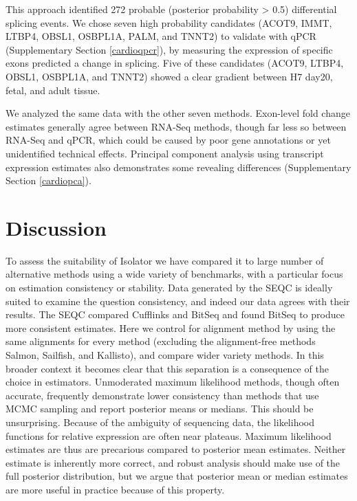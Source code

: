 \documentclass[twocolumn]{article}
\begin{document}
This approach identified 272 probable (posterior probability > 0.5) differential
splicing events. We chose seven high probability candidates (ACOT9, IMMT, LTBP4,
OBSL1, OSBPL1A, PALM, and TNNT2) to validate with qPCR (Supplementary Section
\ref{cardioqpcr}), by measuring the expression of specific exons predicted a
change in splicing. Five of these candidates (ACOT9, LTBP4, OBSL1, OSBPL1A, and
TNNT2) showed a clear gradient between H7 day20, fetal, and adult tissue.

We analyzed the same data with the other seven methods. Exon-level fold change
estimates generally agree between RNA-Seq methods, though far less so between
RNA-Seq and qPCR, which could be caused by poor gene annotations or yet
unidentified technical effects. Principal component analysis using transcript
expression estimates also demonstrates some revealing differences (Supplementary
Section \ref{cardiopca}).

\section{Discussion}\label{discussion}

To assess the suitability of Isolator we have compared it to large number of
alternative methods using a wide variety of benchmarks, with a particular focus
on estimation consistency or stability. Data generated by the SEQC is ideally
suited to examine the question consistency, and indeed our data agrees with
their results. The SEQC compared Cufflinks and BitSeq and found BitSeq to
produce more consistent estimates. Here we control for alignment method by using
the same alignments for every method (excluding the alignment-free methods
Salmon, Sailfish, and Kallisto), and compare wider variety methods. In this
broader context it becomes clear that this separation is a consequence of the
choice in estimators. Unmoderated maximum likelihood methods, though often
accurate, frequently demonstrate lower consistency than methods that use MCMC
sampling and report posterior means or medians. This should be unsurprising.
Because of the ambiguity of sequencing data, the likelihood functions for
relative expression are often near plateaus. Maximum likelihood estimates are
thus are precarious compared to posterior mean estimates. Neither estimate is
inherently more correct, and robust analysis should make use of the full
posterior distribution, but we argue that posterior mean or median estimates
are more useful in practice because of this property.
\end{document}
